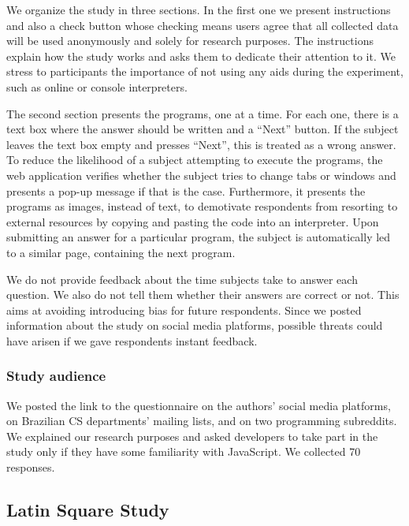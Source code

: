 We organize the study in three sections. In the first one we present instructions and also a check button whose checking means users agree that all collected data will be used anonymously and solely for research purposes. The instructions explain how the study works and asks them to dedicate their attention to it. We stress to participants the importance of not using any aids during the experiment, such as online or console interpreters. 

The second section presents the programs, one at a time. For each one, there is a text box where the answer should be written and a ``Next'' button. If the subject leaves the text box empty and presses ``Next'', this is treated as a wrong answer. To reduce the likelihood of a subject attempting to execute the programs, the web application verifies whether the subject tries to change tabs or windows and presents a pop-up message if that is the case. Furthermore, it presents the programs as images, instead of text, to demotivate respondents from resorting to external resources by copying and pasting the code into an interpreter. Upon submitting an answer for a particular program, the subject is automatically led to a similar page, containing the next program.

We do not provide feedback about the time subjects take to answer each question. We also do not tell them whether their answers are correct or not. This aims at avoiding introducing bias for future respondents. Since we posted information about the study on social media platforms, possible threats could have arisen if we gave respondents instant feedback.


\subsubsection*{Study audience}

We posted the link to the questionnaire on the authors' social media platforms, on Brazilian CS departments' mailing lists, and on two programming subreddits. We explained our research purposes and asked developers to take part in the study only if they have some familiarity with JavaScript. We collected 70 responses. %


\subsection{Latin Square Study}\label{sec:meth:survey}


